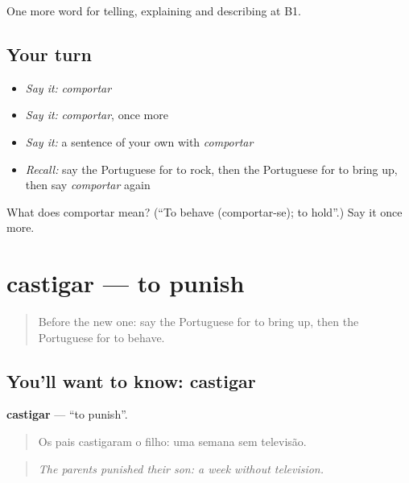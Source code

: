 \begin{grammarlens}[title={What you've built}]
One more word for telling, explaining and describing at B1.
\end{grammarlens}

\subsection*{Your turn}
\begin{itemize}
\raggedright
  \item \emph{Say it:} \emph{comportar}
  \item \emph{Say it:} \emph{comportar}, once more
  \item \emph{Say it:} a sentence of your own with \emph{comportar}
  \item \emph{Recall:} say the Portuguese for to rock, then the Portuguese for to bring up, then say \emph{comportar} again
\end{itemize}

\begin{tcolorbox}[breakable,colback=teal!4,colframe=teal!35!black,title={Before you move on}]
What does comportar mean? (\textquotedblleft{}To behave (comportar-se); to hold\textquotedblright{}.) Say it once more.
\end{tcolorbox}
\section[castigar]{castigar — to punish}

\label{lesson:PT-C495-castigar}



\begin{quote}
Before the new one: say the Portuguese for to bring up, then the Portuguese for to behave.
\end{quote}

\subsection*{You'll want to know: castigar}
\textbf{castigar} — \textquotedblleft{}to punish\textquotedblright{}.

\begin{quote}
Os pais castigaram o filho: uma semana sem televisão.
\end{quote}

\begin{quote}
\emph{The parents punished their son: a week without television.}
\end{quote}


